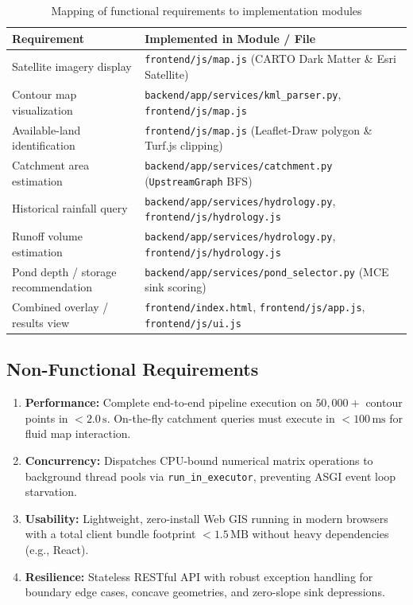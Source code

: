 \documentclass[manuscript,screen,review]{acmart}
\begin{document}
\begin{table}[h]
  \small
  \caption{Mapping of functional requirements to implementation modules}
  \label{tab:requirements}
  \begin{tabular}{lp{8.0cm}}
    \toprule
    Requirement & Implemented in Module / File \\
    \midrule
    Satellite imagery display & \texttt{frontend/js/map.js} (CARTO Dark Matter \& Esri Satellite) \\
    Contour map visualization & \texttt{backend/app/services/kml\_parser.py}, \texttt{frontend/js/map.js} \\
    Available-land identification & \texttt{frontend/js/map.js} (Leaflet-Draw polygon \& Turf.js clipping) \\
    Catchment area estimation & \texttt{backend/app/services/catchment.py} (\texttt{UpstreamGraph} BFS) \\
    Historical rainfall query & \texttt{backend/app/services/hydrology.py}, \texttt{frontend/js/hydrology.js} \\
    Runoff volume estimation & \texttt{backend/app/services/hydrology.py}, \texttt{frontend/js/hydrology.js} \\
    Pond depth / storage recommendation & \texttt{backend/app/services/pond\_selector.py} (MCE sink scoring) \\
    Combined overlay / results view & \texttt{frontend/index.html}, \texttt{frontend/js/app.js}, \texttt{frontend/js/ui.js} \\
    \bottomrule
  \end{tabular}
\end{table}

\subsection{Non-Functional Requirements}
\begin{enumerate}
    \item \textbf{Performance:} Complete end-to-end pipeline execution on $50,000+$ contour points in $<2.0\,\text{s}$. On-the-fly catchment queries must execute in $<100\,\text{ms}$ for fluid map interaction.
    \item \textbf{Concurrency:} Dispatches CPU-bound numerical matrix operations to background thread pools via \texttt{run\_in\_executor}, preventing ASGI event loop starvation.
    \item \textbf{Usability:} Lightweight, zero-install Web GIS running in modern browsers with a total client bundle footprint $<1.5\,\text{MB}$ without heavy dependencies (e.g., React).
    \item \textbf{Resilience:} Stateless RESTful API with robust exception handling for boundary edge cases, concave geometries, and zero-slope sink depressions.
\end{enumerate}
\end{document}
